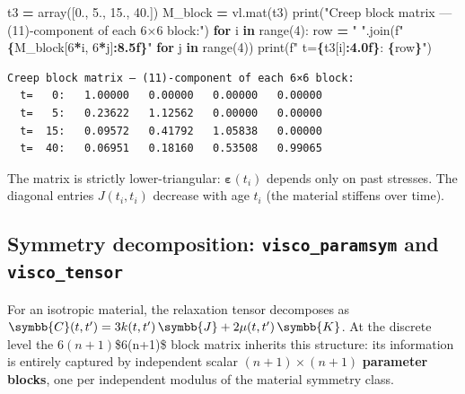 \documentclass[
  a4paper,
  numbers=noendperiod,
  DIV=12]{scrreprt}
\newenvironment{Shaded}{\begin{snugshade}}{\end{snugshade}}
\newcommand{\BuiltInTok}[1]{#1}
\newcommand{\ControlFlowTok}[1]{\textcolor[rgb]{0.13,0.29,0.53}{\textbf{#1}}}
\newcommand{\DecValTok}[1]{\textcolor[rgb]{0.00,0.00,0.81}{#1}}
\newcommand{\FloatTok}[1]{\textcolor[rgb]{0.00,0.00,0.81}{#1}}
\newcommand{\KeywordTok}[1]{\textcolor[rgb]{0.13,0.29,0.53}{\textbf{#1}}}
\newcommand{\NormalTok}[1]{#1}
\newcommand{\OperatorTok}[1]{\textcolor[rgb]{0.81,0.36,0.00}{\textbf{#1}}}
\newcommand{\SpecialCharTok}[1]{\textcolor[rgb]{0.81,0.36,0.00}{\textbf{#1}}}
\newcommand{\SpecialStringTok}[1]{\textcolor[rgb]{0.31,0.60,0.02}{#1}}
\newcommand{\StringTok}[1]{\textcolor[rgb]{0.31,0.60,0.02}{#1}}
\newcommand{\uuuu}[1]{{\symbb{{#1}}}}
\begin{document}
\begin{Shaded}
\begin{Highlighting}[]
\NormalTok{t3 }\OperatorTok{=}\NormalTok{ array([}\FloatTok{0.}\NormalTok{, }\FloatTok{5.}\NormalTok{, }\FloatTok{15.}\NormalTok{, }\FloatTok{40.}\NormalTok{])}
\NormalTok{M\_block }\OperatorTok{=}\NormalTok{ vl.mat(t3)}
\BuiltInTok{print}\NormalTok{(}\StringTok{"Creep block matrix — (11){-}component of each 6×6 block:"}\NormalTok{)}
\ControlFlowTok{for}\NormalTok{ i }\KeywordTok{in} \BuiltInTok{range}\NormalTok{(}\DecValTok{4}\NormalTok{):}
\NormalTok{    row }\OperatorTok{=} \StringTok{"  "}\NormalTok{.join(}\SpecialStringTok{f"}\SpecialCharTok{\{}\NormalTok{M\_block[}\DecValTok{6}\OperatorTok{*}\NormalTok{i, }\DecValTok{6}\OperatorTok{*}\NormalTok{j]}\SpecialCharTok{:8.5f\}}\SpecialStringTok{"} \ControlFlowTok{for}\NormalTok{ j }\KeywordTok{in} \BuiltInTok{range}\NormalTok{(}\DecValTok{4}\NormalTok{))}
    \BuiltInTok{print}\NormalTok{(}\SpecialStringTok{f"  t=}\SpecialCharTok{\{}\NormalTok{t3[i]}\SpecialCharTok{:4.0f\}}\SpecialStringTok{:  }\SpecialCharTok{\{}\NormalTok{row}\SpecialCharTok{\}}\SpecialStringTok{"}\NormalTok{)}
\end{Highlighting}
\end{Shaded}

\begin{verbatim}
Creep block matrix — (11)-component of each 6×6 block:
  t=   0:   1.00000   0.00000   0.00000   0.00000
  t=   5:   0.23622   1.12562   0.00000   0.00000
  t=  15:   0.09572   0.41792   1.05838   0.00000
  t=  40:   0.06951   0.18160   0.53508   0.99065
\end{verbatim}

The matrix is strictly lower-triangular:
\(\boldsymbol{\varepsilon}(t_i)\) depends only on past stresses. The
diagonal entries \(J(t_i,t_i)\) decrease with age \(t_i\) (the material
stiffens over time).

\subsection{\texorpdfstring{Symmetry decomposition:
\texttt{visco\_paramsym} and
\texttt{visco\_tensor}}{Symmetry decomposition: visco\_paramsym and visco\_tensor}}\label{sec-visco-sym}

For an isotropic material, the relaxation tensor decomposes as
\(\uuuu{C}(t,t') = 3k(t,t')\,\uuuu{J} + 2\mu(t,t')\,\uuuu{K}\). At the
discrete level the 6\((n+1)\)\$\times\(6\)(n+1)\$ block matrix inherits
this structure: its information is entirely captured by independent
scalar \((n+1)\times(n+1)\) \textbf{parameter blocks}, one per
independent modulus of the material symmetry class.
\end{document}
